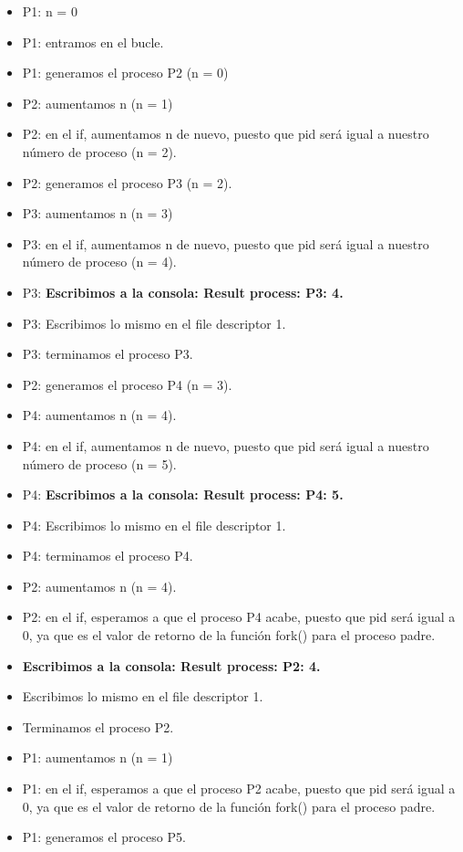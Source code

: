 \documentclass[spanish]{article}
\begin{document}
\begin{itemize}
\item P1: n = 0
\item P1: entramos en el bucle.
\item P1: generamos el proceso P2 (n = 0)

\item P2: aumentamos n (n = 1)
\item P2: en el if, aumentamos n de nuevo, puesto que pid
será igual a nuestro número de proceso (n = 2).
\item P2: generamos el proceso P3 (n = 2).

\item P3: aumentamos n (n = 3)
\item P3: en el if, aumentamos n de nuevo, puesto que pid
será igual a nuestro número de proceso (n = 4).
\item P3: \textbf{Escribimos a la consola: Result process:
P3: 4.}
\item P3: Escribimos lo mismo en el file descriptor 1.
\item P3: terminamos el proceso P3.

\item P2: generamos el proceso P4 (n = 3).

\item P4: aumentamos n (n = 4).
\item P4: en el if, aumentamos n de nuevo, puesto que pid
será igual a nuestro número de proceso (n = 5).
\item P4: \textbf{Escribimos a la consola: Result process:
P4: 5.}
\item P4: Escribimos lo mismo en el file descriptor 1.
\item P4: terminamos el proceso P4.

\item P2: aumentamos n (n = 4).
\item P2: en el if, esperamos a que el proceso P4 acabe,
puesto que pid será igual a 0, ya que es el valor de retorno
de la función fork() para el proceso padre.
\item \textbf{Escribimos a la consola: Result process: P2:
4.}
\item Escribimos lo mismo en el file descriptor 1.
\item Terminamos el proceso P2.

\item P1: aumentamos n (n = 1)
\item P1: en el if, esperamos a que el proceso P2 acabe,
puesto que pid será igual a 0, ya que es el valor de retorno
de la función fork() para el proceso padre.
\item P1: generamos el proceso P5.


\end{itemize}
\end{document}
